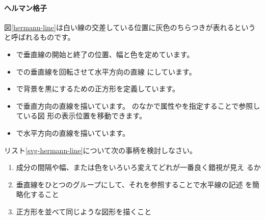 \paragraph{ヘルマン格子}
 図\ref{hermann-line}は白い線の交差している位置に灰色のちらつきが表れるという
と呼ばれるものです。
\begin{itemize}
 \item {}で垂直線の開始と終了の位置、幅と色を定めています。
 \item {}での垂直線を回転させて水平方向の直線
       にしています。
 \item {}で背景を黒にするための正方形を定義しています。
 \item {}で垂直方向の直線を描いています。
       のなかで属性やを指定することで参照している図
       形の表示位置を移動できます。
 \item {}で水平方向の直線を描いています。
\end{itemize}
\begin{Problem}\upshape
 リスト\ref{svg-hermann-line}について次の事柄を検討しなさい。
\begin{enumerate}
 \item 成分の間隔や幅、または色をいろいろ変えてどれが一番良く錯視が見え
       るか
 \item 垂直線をひとつのグループにして、それを参照することで水平線の記述
       を簡略化すること
 \item 正方形を並べて同じような図形を描くこと
\end{enumerate}
\end{Problem}

